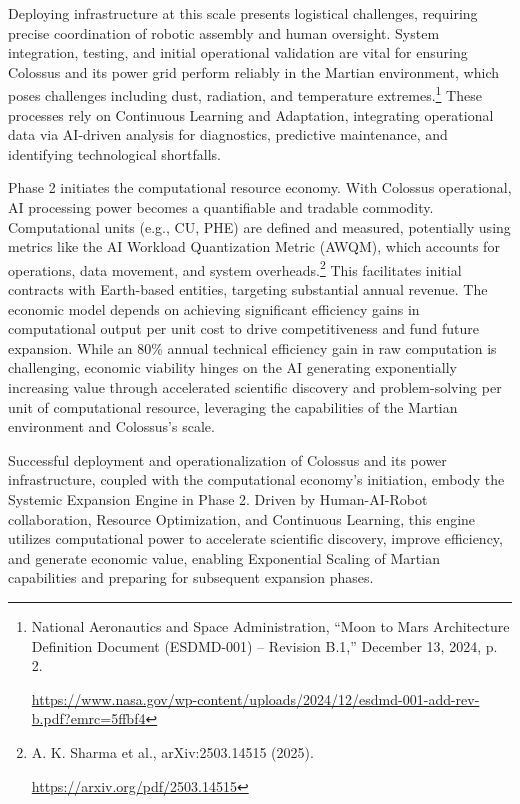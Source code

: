\documentclass[fontsize=10pt, oneside, DIV=calc]{scrartcl}
\begin{document}
\medskip

\noindent
Deploying infrastructure at this scale presents logistical challenges, requiring precise coordination of robotic assembly and human oversight. System integration, testing, and initial operational validation are vital for ensuring Colossus and its power grid perform reliably in the Martian environment, which poses challenges including dust, radiation, and temperature extremes.\footnote{National Aeronautics and Space Administration, ``Moon to Mars Architecture Definition Document (ESDMD-001) – Revision B.1,'' December 13, 2024, p. 2.








\href{https://www.nasa.gov/wp-content/uploads/2024/12/esdmd-001-add-rev-b.pdf?emrc=5ffbf4}\url{https://www.nasa.gov/wp-content/uploads/2024/12/esdmd-001-add-rev-b.pdf?emrc=5ffbf4}} These processes rely on Continuous Learning and Adaptation, integrating operational data via AI-driven analysis for diagnostics, predictive maintenance, and identifying technological shortfalls.

\medskip

\noindent
Phase 2 initiates the computational resource economy. With Colossus operational, AI processing power becomes a quantifiable and tradable commodity. Computational units (e.g., CU, PHE) are defined and measured, potentially using metrics like the AI Workload Quantization Metric (AWQM), which accounts for operations, data movement, and system overheads.\footnote{A. K. Sharma et al., arXiv:2503.14515 (2025).








\href{https://arxiv.org/pdf/2503.14515}\url{https://arxiv.org/pdf/2503.14515}} This facilitates initial contracts with Earth-based entities, targeting substantial annual revenue. The economic model depends on achieving significant efficiency gains in computational output per unit cost to drive competitiveness and fund future expansion. While an 80\% annual technical efficiency gain in raw computation is challenging, economic viability hinges on the AI generating exponentially increasing value through accelerated scientific discovery and problem-solving per unit of computational resource, leveraging the capabilities of the Martian environment and Colossus's scale.

\medskip

\noindent
Successful deployment and operationalization of Colossus and its power infrastructure, coupled with the computational economy's initiation, embody the Systemic Expansion Engine in Phase 2. Driven by Human-AI-Robot collaboration, Resource Optimization, and Continuous Learning, this engine utilizes computational power to accelerate scientific discovery, improve efficiency, and generate economic value, enabling Exponential Scaling of Martian capabilities and preparing for subsequent expansion phases.
\end{document}
